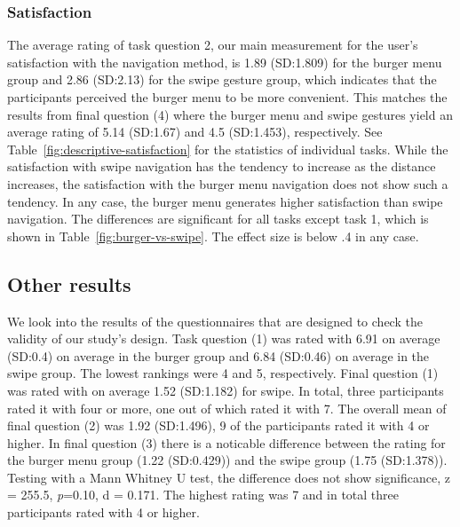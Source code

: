 \documentclass{sig-alternate-05-2015}
\begin{document}
\subsubsection{Satisfaction}
The average rating of task question 2, our main measurement for the user's satisfaction with the navigation method, is 1.89 (SD:\@1.809) for the burger menu group and 2.86 (SD:\@2.13)
for the swipe gesture group, which indicates that the participants perceived the burger menu to be more convenient. This matches the results from final question (4) 
where the burger menu and swipe gestures yield an average rating of 5.14  (SD:\@1.67) and 4.5 (SD:\@1.453), respectively.
See Table~\ref{fig:descriptive-satisfaction} for the statistics of individual tasks. While the satisfaction with swipe navigation has the tendency to increase as the distance increases,
the satisfaction with the burger menu navigation does not show such a tendency. In any case, the burger menu generates higher satisfaction than swipe navigation. The differences are 
significant for all tasks except task 1, which is shown in Table~\ref{fig:burger-vs-swipe}. The effect size is below .4 in any case.
\begin{table}[!h]
\centering
\caption{Mean (standard deviation) of satisfaction}
\label{fig:descriptive-satisfaction}
\end{table}

\subsection{Other results}
We look into
the results of the questionnaires that are designed to check the validity of our study's design. Task question (1) was rated with
6.91 on average (SD:\@0.4) on average in the burger group and 6.84 (SD:\@0.46) on average in the swipe group. The lowest rankings were
4 and 5, respectively.
Final question (1) was rated with on average 1.52 (SD:\@1.182) for swipe. In total, three participants rated
it with four or more, one out of which rated it with 7. The overall mean of final question (2) was 1.92 (SD:\@1.496), 9 of the participants rated it
with 4 or higher. In final question (3) there is a noticable difference between the rating for the burger menu group (1.22 (SD:\@0.429)) and the swipe group
(1.75 (SD:\@1.378)). Testing with a Mann Whitney U test, the difference does not show significance, z = 255.5, \emph{p}=0.10, d = 0.171. The highest rating was 7
and in total three participants rated with 4 or higher.
\end{document}
